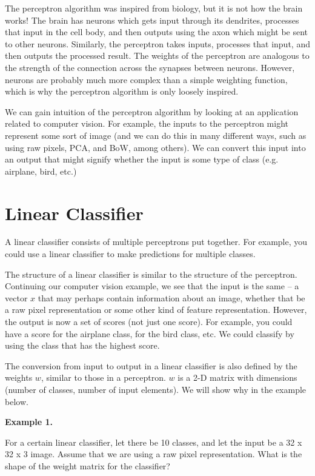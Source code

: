 \documentclass{article}
\begin{document}
The perceptron algorithm was inspired from biology, but it is not how the brain works! The brain has neurons which gets input through its dendrites, processes that input in the cell body, and then outputs using the axon which might be sent to other neurons. Similarly, the perceptron takes inputs, processes that input, and then outputs the processed result. The weights of the perceptron are analogous to the strength of the connection across the synapses between neurons. However, neurons are probably much more complex than a simple weighting function, which is why the perceptron algorithm is only loosely inspired.

We can gain intuition of the perceptron algorithm by looking at an application related to computer vision. For example, the inputs to the perceptron might represent some sort of image (and we can do this in many different ways, such as using raw pixels, PCA, and BoW, among others). We can convert this input into an output that might signify whether the input is some type of class (e.g. airplane, bird, etc.)

\section{Linear Classifier}

A linear classifier consists of multiple perceptrons put together. For example, you could use a linear classifier to make predictions for multiple classes.

The structure of a linear classifier is similar to the structure of the perceptron. Continuing our computer vision example, we see that the input is the same – a vector $x$ that may perhaps contain information about an image, whether that be a raw pixel representation or some other kind of feature representation. However, the output is now a set of scores (not just one score). For example, you could have a score for the airplane class, for the bird class, etc. We could classify by using the class that has the highest score.

The conversion from input to output in a linear classifier is also defined by the weights $w$, similar to those in a perceptron. $w$ is a 2-D matrix with dimensions (number of classes, number of input elements). We will show why in the example below.

\bigskip

\textbf{Example 1.}

For a certain linear classifier, let there be 10 classes, and let the input be a 32 x 32 x 3 image. Assume that we are using a raw pixel representation. What is the shape of the weight matrix for the classifier?
\end{document}
